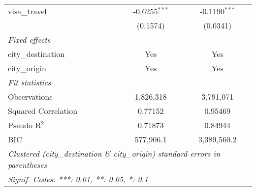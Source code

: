 \begin{tabular}{lcc}
   visa\_travel                      & -0.6255$^{***}$     & -0.1190$^{***}$\\   
                                     & (0.1574)            & (0.0341)\\   
   \midrule
   \emph{Fixed-effects}\\
   city\_destination                 & Yes                 & Yes\\  
   city\_origin                      & Yes                 & Yes\\  
   \midrule
   \emph{Fit statistics}\\
   Observations                      & 1,826,318           & 3,791,071\\  
   Squared Correlation               & 0.77152             & 0.95469\\  
   Pseudo R$^2$                      & 0.71873             & 0.84944\\  
   BIC                               & 577,906.1           & 3,389,560.2\\  
   \midrule \midrule
   \multicolumn{3}{l}{\emph{Clustered (city\_destination \& city\_origin) standard-errors in parentheses}}\\
   \multicolumn{3}{l}{\emph{Signif. Codes: ***: 0.01, **: 0.05, *: 0.1}}\\
\end{tabular}
\par\endgroup



